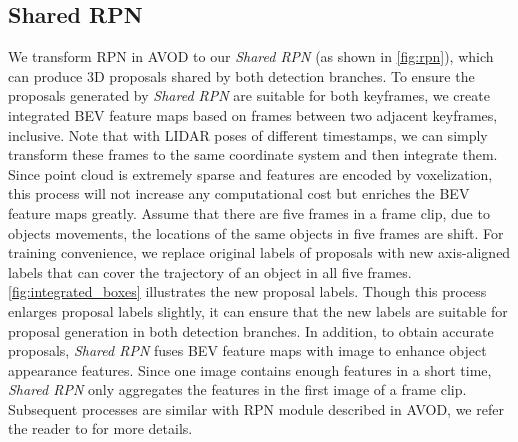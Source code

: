 \documentclass[letterpaper, 10pt, conference]{ieeeconf}  %
\begin{document}
\subsection{Shared RPN}

We transform RPN in AVOD \cite{ku2018joint} to our \textit{Shared RPN} (as shown in \figurename \ref{fig:rpn}), which can produce 3D proposals shared by both detection branches. To ensure the proposals generated by \textit{Shared RPN} are suitable for both keyframes, we create integrated BEV feature maps based on frames between two adjacent keyframes, inclusive. Note that with LIDAR poses of different timestamps, we can simply transform these frames to the same coordinate system and then integrate them. Since point cloud is extremely sparse and features are encoded by voxelization, this process will not increase any computational cost but enriches the BEV feature maps greatly. Assume that there are five frames in a frame clip, due to objects movements, the locations of the same objects in five frames are shift. For training convenience, we replace original labels of proposals with new axis-aligned labels that can cover the trajectory of an object in all five frames. \figurename \ref{fig:integrated_boxes} illustrates the new proposal labels. Though this process enlarges proposal labels slightly, it can ensure that the new labels are suitable for proposal generation in both detection branches. In addition, to obtain accurate proposals, \textit{Shared RPN} fuses BEV feature maps with image to enhance object appearance features. Since one image contains enough features in a short time, \textit{Shared RPN} only aggregates the features in the first image of a frame clip. Subsequent processes are similar with RPN module described in AVOD, we refer the reader to \cite{ku2018joint} for more details.

\end{document}
